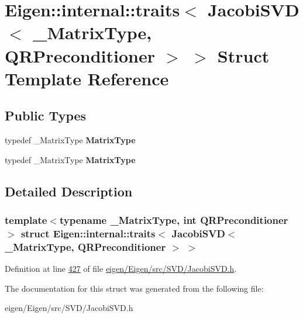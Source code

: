 \hypertarget{struct_eigen_1_1internal_1_1traits_3_01_jacobi_s_v_d_3_01___matrix_type_00_01_q_r_preconditioner_01_4_01_4}{}\section{Eigen\+:\+:internal\+:\+:traits$<$ Jacobi\+S\+VD$<$ \+\_\+\+Matrix\+Type, Q\+R\+Preconditioner $>$ $>$ Struct Template Reference}
\label{struct_eigen_1_1internal_1_1traits_3_01_jacobi_s_v_d_3_01___matrix_type_00_01_q_r_preconditioner_01_4_01_4}
\subsection*{Public Types}
\begin{DoxyCompactItemize}
\item 
\mbox{\label{struct_eigen_1_1internal_1_1traits_3_01_jacobi_s_v_d_3_01___matrix_type_00_01_q_r_preconditioner_01_4_01_4_a0c5efadd389b46f324bdee9e47f7c273}} 
typedef \+\_\+\+Matrix\+Type {\bfseries Matrix\+Type}
\item 
\mbox{\label{struct_eigen_1_1internal_1_1traits_3_01_jacobi_s_v_d_3_01___matrix_type_00_01_q_r_preconditioner_01_4_01_4_a0c5efadd389b46f324bdee9e47f7c273}} 
typedef \+\_\+\+Matrix\+Type {\bfseries Matrix\+Type}
\end{DoxyCompactItemize}


\subsection{Detailed Description}
\subsubsection*{template$<$typename \+\_\+\+Matrix\+Type, int Q\+R\+Preconditioner$>$\newline
struct Eigen\+::internal\+::traits$<$ Jacobi\+S\+V\+D$<$ \+\_\+\+Matrix\+Type, Q\+R\+Preconditioner $>$ $>$}



Definition at line \hyperlink{eigen_2_eigen_2src_2_s_v_d_2_jacobi_s_v_d_8h_source_l00427}{427} of file \hyperlink{eigen_2_eigen_2src_2_s_v_d_2_jacobi_s_v_d_8h_source}{eigen/\+Eigen/src/\+S\+V\+D/\+Jacobi\+S\+V\+D.\+h}.



The documentation for this struct was generated from the following file\+:\begin{DoxyCompactItemize}
\item 
eigen/\+Eigen/src/\+S\+V\+D/\+Jacobi\+S\+V\+D.\+h\end{DoxyCompactItemize}

